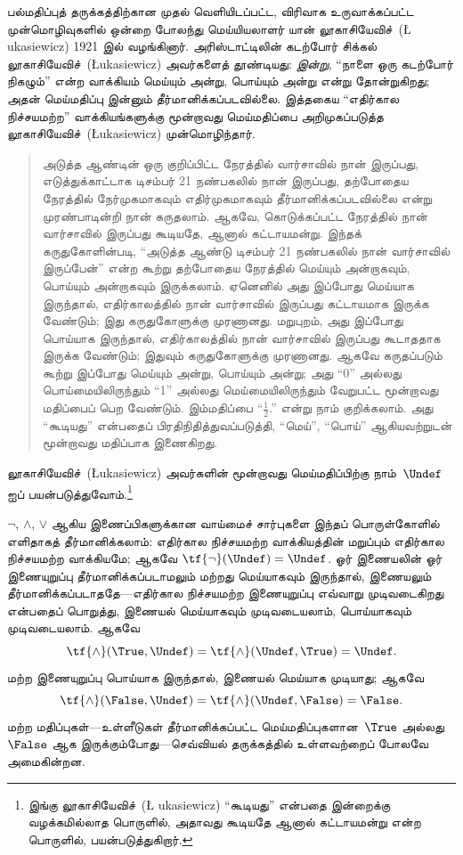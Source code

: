 \documentclass[../../../include/open-logic-section]{subfiles}
\begin{document}


பல்மதிப்புத் தருக்கத்திற்கான முதல் வெளியிடப்பட்ட, விரிவாக உருவாக்கப்பட்ட
முன்மொழிவுகளில் ஒன்றை போலந்து மெய்யியலாளர் யான் லூகாசியேவிச்~(\L
ukasiewicz) 1921 இல் வழங்கினார். அரிஸ்டாட்டிலின் கடற்போர் சிக்கல்
லூகாசியேவிச்~(\L ukasiewicz) அவர்களைத் தூண்டியது:
\emph{இன்று}, ``நாளை ஒரு கடற்போர் நிகழும்'' என்ற வாக்கியம் மெய்யும் அன்று,
பொய்யும் அன்று என்று தோன்றுகிறது; அதன் மெய்மதிப்பு இன்னும்
தீர்மானிக்கப்படவில்லை. இத்தகைய ``எதிர்கால நிச்சயமற்ற'' வாக்கியங்களுக்கு
மூன்றாவது மெய்மதிப்பை அறிமுகப்படுத்த லூகாசியேவிச்~(\L ukasiewicz)
முன்மொழிந்தார்.
\begin{quote}
அடுத்த ஆண்டின் ஒரு குறிப்பிட்ட நேரத்தில் வார்சாவில் நான் இருப்பது,
எடுத்துக்காட்டாக டிசம்பர் 21 நண்பகலில் நான் இருப்பது, தற்போதைய நேரத்தில்
நேர்முகமாகவும் எதிர்முகமாகவும் தீர்மானிக்கப்படவில்லை என்று முரண்பாடின்றி
நான் கருதலாம். ஆகவே, கொடுக்கப்பட்ட நேரத்தில் நான் வார்சாவில் இருப்பது
கூடியதே, ஆனால் கட்டாயமன்று. இந்தக் கருதுகோளின்படி, ``அடுத்த ஆண்டு டிசம்பர்
21 நண்பகலில் நான் வார்சாவில் இருப்பேன்'' என்ற கூற்று தற்போதைய நேரத்தில்
மெய்யும் அன்றாகவும், பொய்யும் அன்றாகவும் இருக்கலாம். ஏனெனில் அது இப்போது
மெய்யாக இருந்தால், எதிர்காலத்தில் நான் வார்சாவில் இருப்பது கட்டாயமாக
இருக்க வேண்டும்; இது கருதுகோளுக்கு முரணானது. மறுபுறம், அது இப்போது
பொய்யாக இருந்தால், எதிர்காலத்தில் நான் வார்சாவில் இருப்பது கூடாததாக
இருக்க வேண்டும்; இதுவும் கருதுகோளுக்கு முரணானது. ஆகவே கருதப்படும் கூற்று
இப்போது மெய்யும் அன்று, பொய்யும் அன்று; அது ``0'' அல்லது பொய்மையிலிருந்தும்
``1'' அல்லது மெய்மையிலிருந்தும் வேறுபட்ட மூன்றாவது மதிப்பைப் பெற வேண்டும்.
இம்மதிப்பை ``$\frac{1}{2}$.'' என்று நாம் குறிக்கலாம். அது ``கூடியது''
என்பதைப் பிரதிநிதித்துவப்படுத்தி, ``மெய்'', ``பொய்'' ஆகியவற்றுடன் மூன்றாவது
மதிப்பாக இணைகிறது.
\end{quote}
லூகாசியேவிச்~(\L ukasiewicz) அவர்களின் மூன்றாவது மெய்மதிப்பிற்கு
நாம்~$\Undef$ ஐப் பயன்படுத்துவோம்.\footnote{இங்கு லூகாசியேவிச்~(\L
ukasiewicz) ``கூடியது'' என்பதை இன்றைக்கு
வழக்கமில்லாத பொருளில், அதாவது கூடியதே ஆனால் கட்டாயமன்று என்ற பொருளில்,
பயன்படுத்துகிறார்.}

$\lnot$, $\land$, $\lor$ ஆகிய இணைப்பிகளுக்கான வாய்மைச் சார்புகளை இந்தப்
பொருள்கோளில் எளிதாகத் தீர்மானிக்கலாம்: எதிர்கால நிச்சயமற்ற வாக்கியத்தின்
மறுப்பும் எதிர்கால நிச்சயமற்ற வாக்கியமே; ஆகவே
$\tf{\lnot}(\Undef) = \Undef$. ஓர் இணையலின் ஓர் இணையுறுப்பு
தீர்மானிக்கப்படாமலும் மற்றது மெய்யாகவும் இருந்தால், இணையலும்
தீர்மானிக்கப்படாததே---எதிர்கால நிச்சயமற்ற இணையுறுப்பு எவ்வாறு முடிவடைகிறது
என்பதைப் பொறுத்து, இணையல் மெய்யாகவும் முடிவடையலாம், பொய்யாகவும் முடிவடையலாம்.
ஆகவே
\[
    \tf{\land}(\True, \Undef) =
\tf{\land}(\Undef, \True) =
\Undef.
\]
மற்ற இணையுறுப்பு பொய்யாக இருந்தால், இணையல் மெய்யாக முடியாது; ஆகவே
\[\tf{\land}(\False, \Undef) =
\tf{\land}(\Undef, \False) = \False.\]
மற்ற மதிப்புகள்---உள்ளீடுகள் தீர்மானிக்கப்பட்ட மெய்மதிப்புகளான~$\True$
அல்லது~$\False$ ஆக இருக்கும்போது---செவ்வியல் தருக்கத்தில் உள்ளவற்றைப் போலவே
அமைகின்றன.
\end{document}
